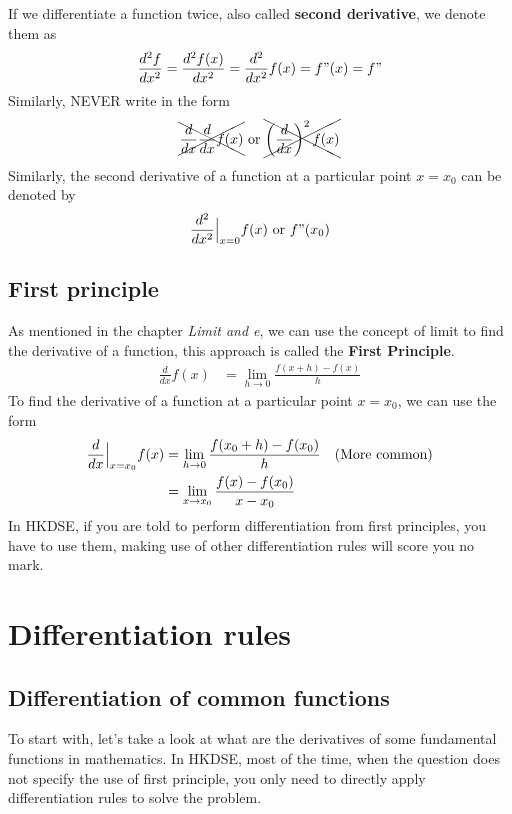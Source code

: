 \documentclass{article}
\begin{document}
If we differentiate a function twice,
also called \textbf{second derivative}, 
we denote them as
\begin{equation*}
    \frac{d^{2} f}{dx^{2}} =\frac{d^{2} f( x)}{dx^{2}} =\frac{d^{2}}{dx^{2}} f( x) =f"( x) =f"
\end{equation*}
Similarly, NEVER write in the form
\begin{equation*}
    \xcancel{\frac{d}{dx}\frac{d}{dx} f(x)} \ \text{or} \ \xcancel{\left(\frac{d}{dx}\right)^{2} f(x)}
\end{equation*}
Similarly, the second derivative of a
function at a particular point
$x=x_0$ can be denoted by
\begin{equation*}
    \frac{d^{2}}{dx^{2}}\Bigl|_{x=0} f( x) \ \text{or} \ f"(x_0)
\end{equation*}
\subsection{First principle}
As mentioned in the chapter \textit{Limit and e},
we can use the concept of limit to find
the derivative of a function, this approach
is called the \textbf{First Principle}.
\begin{equation*}
\begin{aligned}
    \frac{d}{dx} f( x) & =\lim _{h\rightarrow 0}\frac{f( x+h) -f( x)}{h}
\end{aligned}
\end{equation*}
To find the derivative of a function at
a particular point $x=x_0$, we can use the form
\begin{equation*}
\begin{aligned}
    \frac{d}{dx}\Bigl|_{x=x_{0}} f( x) & =\lim _{h\rightarrow 0}\frac{f( x_{0} +h) -f( x_{0})}{h} & \text{(More common)}\\
     & =\lim _{x\rightarrow x_{0}}\frac{f( x) -f( x_{0})}{x-x_{0}} & 
\end{aligned}
\end{equation*}
In HKDSE, if you are told to perform
differentiation from first principles,
you have to use them, making use of other
differentiation rules will score you no
mark.
\clearpage
\pagebreak
\section{Differentiation rules}
\subsection{Differentiation of common functions}
\label{subsec:commonFunctions}
To start with, let's take a look at what
are the derivatives of some fundamental
functions in mathematics. In HKDSE,
most of the time, when the question
does not specify the use of first
principle, you only need to directly
apply differentiation rules to solve the
problem.
\end{document}

